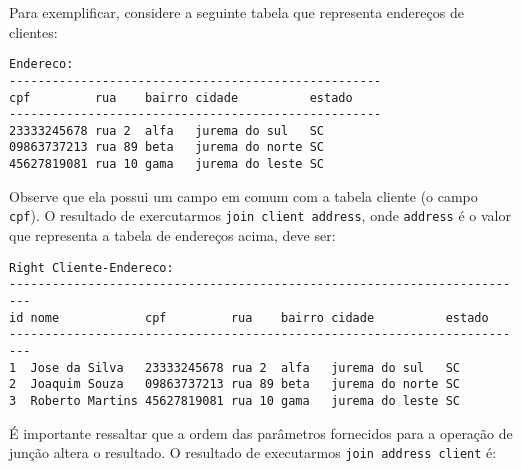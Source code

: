 \documentclass[11pt,a4paper]{report}
\begin{document}
Para exemplificar, considere a seguinte tabela que representa endere\c{c}os de clientes:

\begin{verbatim}
Endereco:
----------------------------------------------------
cpf         rua    bairro cidade          estado 
----------------------------------------------------
23333245678 rua 2  alfa   jurema do sul   SC     
09863737213 rua 89 beta   jurema do norte SC     
45627819081 rua 10 gama   jurema do leste SC     
\end{verbatim}
Observe que ela possui um campo em comum com a tabela cliente (o campo \texttt{cpf}). O resultado de exercutarmos 
\texttt{join client address}, onde \texttt{address} \'e o valor que representa a tabela de endere\c{c}os acima, deve ser:

\begin{verbatim}
Right Cliente-Endereco:
-------------------------------------------------------------------------
id nome            cpf         rua    bairro cidade          estado 
-------------------------------------------------------------------------
1  Jose da Silva   23333245678 rua 2  alfa   jurema do sul   SC     
2  Joaquim Souza   09863737213 rua 89 beta   jurema do norte SC     
3  Roberto Martins 45627819081 rua 10 gama   jurema do leste SC  
\end{verbatim}
\'E importante ressaltar que a ordem das par\^ametros fornecidos para a opera\c{c}\~ao de jun\c{c}\~ao altera o 
resultado. O resultado de executarmos \texttt{join address client} \'e:
\end{document}

